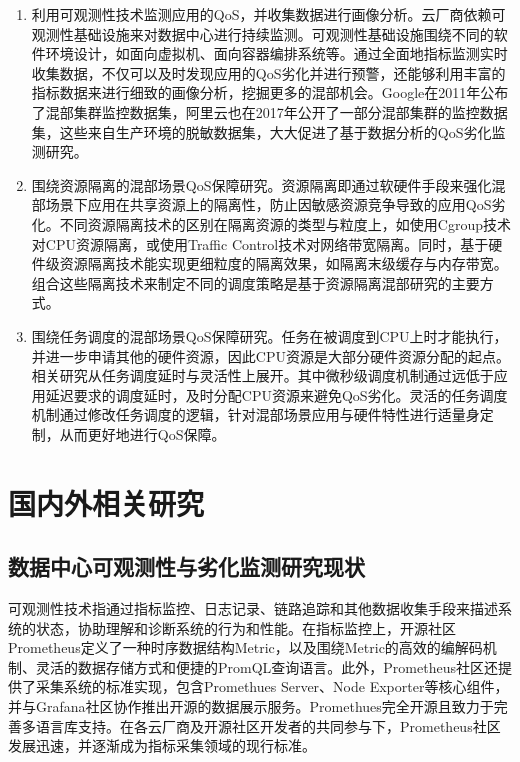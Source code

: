 \begin{enumerate}

    \item 利用可观测性技术监测应用的QoS，并收集数据进行画像分析。云厂商依赖可观测性基础设施来对数据中心进行持续监测。可观测性基础设施围绕不同的软件环境设计，如面向虚拟机、面向容器编排系统等。通过全面地指标监测实时收集数据，不仅可以及时发现应用的QoS劣化并进行预警，还能够利用丰富的指标数据来进行细致的画像分析，挖掘更多的混部机会。Google在2011年公布了混部集群监控数据集，阿里云也在2017年公开了一部分混部集群的监控数据集\citep{guo2019limits}，这些来自生产环境的脱敏数据集，大大促进了基于数据分析的QoS劣化监测研究。

    \item 围绕资源隔离的混部场景QoS保障研究。资源隔离即通过软硬件手段来强化混部场景下应用在共享资源上的隔离性，防止因敏感资源竞争导致的应用QoS劣化。不同资源隔离技术的区别在隔离资源的类型与粒度上，如使用Cgroup技术对CPU资源隔离，或使用Traffic Control技术\citep{hubert2002linux}对网络带宽隔离。同时，基于硬件级资源隔离技术能实现更细粒度的隔离效果，如隔离末级缓存与内存带宽。组合这些隔离技术来制定不同的调度策略是基于资源隔离混部研究的主要方式。

    \item 围绕任务调度的混部场景QoS保障研究。任务在被调度到CPU上时才能执行，并进一步申请其他的硬件资源，因此CPU资源是大部分硬件资源分配的起点。相关研究从任务调度延时与灵活性上展开。其中微秒级调度机制通过远低于应用延迟要求的调度延时，及时分配CPU资源来避免QoS劣化。灵活的任务调度机制通过修改任务调度的逻辑，针对混部场景应用与硬件特性进行适量身定制，从而更好地进行QoS保障。

\end{enumerate}


\section{国内外相关研究}

\subsection{数据中心可观测性与劣化监测研究现状}


可观测性技术指通过指标监控、日志记录、链路追踪和其他数据收集手段来描述系统的状态，协助理解和诊断系统的行为和性能。在指标监控上，开源社区Prometheus\citep{brazil2018prometheus}定义了一种时序数据结构Metric，以及围绕Metric的高效的编解码机制、灵活的数据存储方式和便捷的PromQL查询语言。此外，Prometheus社区还提供了采集系统的标准实现，包含Promethues Server、Node Exporter等核心组件，并与Grafana社区协作推出开源的数据展示服务。Promethues完全开源且致力于完善多语言库支持。在各云厂商及开源社区开发者的共同参与下，Prometheus社区发展迅速，并逐渐成为指标采集领域的现行标准。

